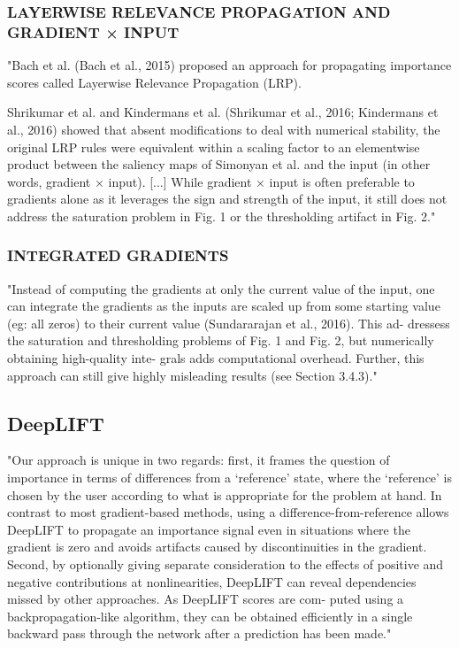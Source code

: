 \documentclass[]{scrartcl}
\begin{document}
\subsubsection{LAYERWISE RELEVANCE PROPAGATION AND GRADIENT × INPUT}
"Bach et al. (Bach et al., 2015) proposed an approach for propagating importance scores called Layerwise Relevance Propagation (LRP).

Shrikumar et al. and Kindermans et al. (Shrikumar et al., 2016; Kindermans et al., 2016) showed that absent modifications to deal with numerical stability, the original LRP rules were equivalent within a scaling factor to an elementwise product between the saliency maps of Simonyan et al. and the input (in other words, gradient × input).
[...]
While gradient × input is often preferable to gradients alone as it leverages the sign and strength of the input, it still does not address the saturation problem in Fig. 1 or the thresholding artifact in Fig. 2." \cite{Shrikumar2017}
\subsubsection{INTEGRATED GRADIENTS}
"Instead of computing the gradients at only the current value of the input, one can integrate the gradients as the inputs are scaled up from some starting value (eg: all zeros) to their current value (Sundararajan et al., 2016). This ad- dressess the saturation and thresholding problems of Fig. 1 and Fig. 2, but numerically obtaining high-quality inte- grals adds computational overhead. Further, this approach can still give highly misleading results (see Section 3.4.3)." \cite{Shrikumar2017}

\subsection{DeepLIFT}
"Our approach is unique in two regards: first, it frames the question of importance in terms of differences from a ‘reference’ state, where the ‘reference’ is chosen by the user according to what is appropriate for the problem at hand. In contrast to most gradient-based methods, using a difference-from-reference allows DeepLIFT to propagate an importance signal even in situations where the gradient is zero and avoids artifacts caused by discontinuities in the gradient. Second, by optionally giving separate consideration to the effects of positive and negative contributions at nonlinearities, DeepLIFT can reveal dependencies missed by other approaches. As DeepLIFT scores are com- puted using a backpropagation-like algorithm, they can be obtained efficiently in a single backward pass through the network after a prediction has been made." \cite{Shrikumar2017}
\end{document}

